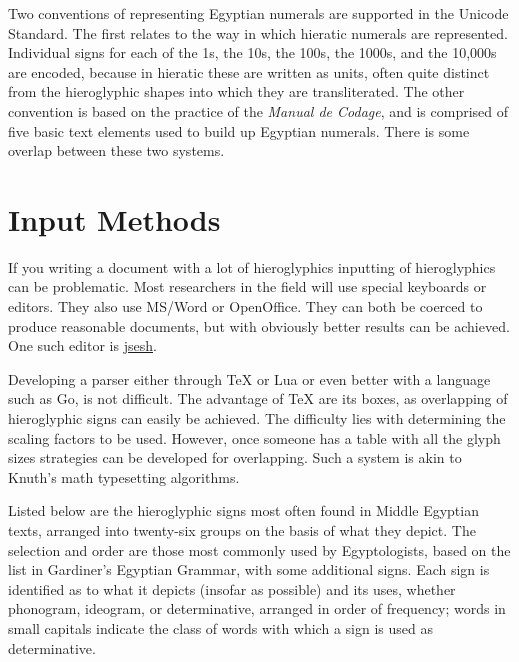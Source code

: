 Two conventions of representing Egyptian numerals are supported in the Unicode Standard.
The first relates to the way in which hieratic numerals are represented. Individual
signs for each of the 1s, the 10s, the 100s, the 1000s, and the 10,000s are encoded, because in
hieratic these are written as units, often quite distinct from the hieroglyphic shapes into
which they are transliterated. The other convention is based on the practice of the \emph{Manual
de Codage}, and is comprised of five basic text elements used to build up Egyptian numerals.
There is some overlap between these two systems.

%

\section{Input Methods}

If you writing a document with a lot of hieroglyphics inputting of hieroglyphics can be problematic. Most researchers in the field will use special keyboards or editors. They also use MS/Word or OpenOffice. They can both be coerced to produce reasonable documents, but with \tex obviously better results can be achieved. One such editor is \href{http://jsesh.qenherkhopeshef.org/}{jsesh}. 

Developing a parser either through TeX or Lua or even better with a language such as Go, is not difficult. The advantage of TeX are its boxes, as overlapping of hieroglyphic signs can easily be achieved. The difficulty lies with determining the scaling factors to be used. However, once someone has a table with all the glyph sizes strategies can be developed for overlapping. Such a system is akin to Knuth's math typesetting algorithms. 

Listed below are the hieroglyphic signs most often found in Middle Egyptian texts,
arranged into twenty-six groups on the basis of what they depict. The selection and
order are those most commonly used by Egyptologists, based on the list in Gardiner’s
Egyptian Grammar, with some additional signs. Each sign is identified as to what it depicts (insofar as possible) and its uses, whether phonogram, ideogram, or determinative,
arranged in order of frequency; words in small capitals indicate the class of words with
which a sign is used as determinative. 

